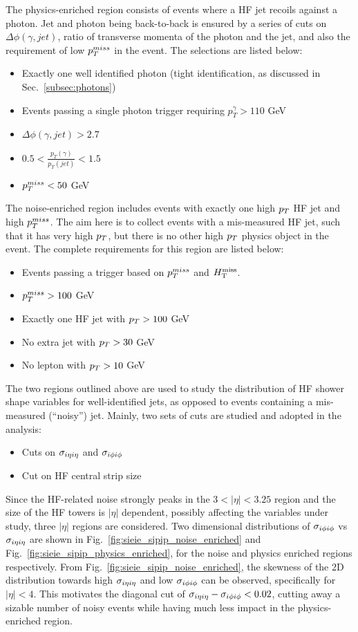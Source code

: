 The physics-enriched region consists of events where a HF jet recoils against a photon. Jet and photon being back-to-back is ensured by a series of cuts on $\Delta\phi(\gamma, jet)$,
ratio of transverse momenta of the photon and the jet, and also the requirement of low $p_T^{miss}$ in the event. The selections are listed below: 

\begin{itemize}
    \item Exactly one well identified photon (tight identification, as discussed in Sec.~\ref{subsec:photons})
    \item Events passing a single photon trigger requiring $p_T^{\gamma} > 110$ GeV
    \item $\Delta\phi(\gamma, jet) > 2.7$
    \item $0.5 < \frac{p_T(\gamma)}{p_T(jet)} < 1.5$
    \item $p_T^{miss} < 50$ GeV
\end{itemize}

The noise-enriched region includes events with exactly one high $p_T$ HF jet and high $p_T^{miss}$.
The aim here is to collect events with a mis-measured HF jet, such that it has very high $p_T$, but there is no other high $p_T$ physics object in the event. 
The complete requirements for this region are listed below:

\begin{itemize}
    \item Events passing a trigger based on $p_T^{miss}$ and $H_{\mathrm{T}}^{\mathrm{miss}}$. 
    \item $p_T^{miss} > 100$ GeV
    \item Exactly one HF jet with $p_T > 100$ GeV
    \item No extra jet with $p_T > 30$ GeV
    \item No lepton with $p_T > 10$ GeV
\end{itemize}

The two regions outlined above are used to study the distribution of HF shower shape variables for well-identified jets, as opposed to events
containing a mis-measured (``noisy'') jet. Mainly, two sets of cuts are studied and adopted in the analysis:

\begin{itemize}
    \item Cuts on $\sigma_{i\eta i\eta}$ and $\sigma_{i\phi i\phi}$
    \item Cut on HF central strip size
\end{itemize}

Since the HF-related noise strongly peaks in the $3<|\eta|<3.25$ region and the size of the HF towers is $|\eta|$ dependent, 
possibly affecting the variables under study, three $|\eta|$ regions are considered. 
Two dimensional distributions of $\sigma_{i\phi i\phi}$ vs  $\sigma_{i\eta i\eta}$ are shown in Fig.~\ref{fig:sieie_sipip_noise_enriched} and Fig.~\ref{fig:sieie_sipip_physics_enriched},
for the noise and physics enriched regions respectively. 
From Fig.~\ref{fig:sieie_sipip_noise_enriched}, the skewness of the 2D distribution towards high $\sigma_{i\eta i\eta}$ and low $\sigma_{i\phi i\phi}$
can be observed, specifically for $|\eta| < 4$. This motivates the diagonal cut of $\sigma_{i\eta i\eta} - \sigma_{i\phi i\phi} < 0.02$, cutting away a sizable number of noisy events while
having much less impact in the physics-enriched region. 

